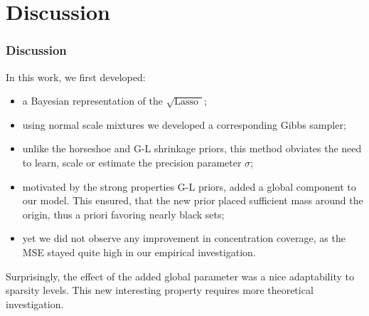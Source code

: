 \documentclass[10pt]{beamer}
\theoremstyle{plain}
\newcommand{\blankline}{\quad\pagebreak[3]}
\def\sql{$\sqrt{\text{Lasso }}$}
\def\sqdl{$\sqrt{\text{DL }}$}
\begin{document}
\section{Discussion}
\begin{frame}
\frametitle{Discussion}
In this work, we first developed:

\begin{itemize}
	\item  a Bayesian representation of the \sql;
	\item using normal scale mixtures we developed a corresponding Gibbs sampler;
	\item unlike the horseshoe and G-L shrinkage priors, this method obviates the need to learn, scale or estimate the precision parameter $\sigma$;
	\item motivated by the strong properties G-L priors, added a global component to our model. This ensured, that the new prior placed sufficient mass around the origin, thus a priori favoring nearly black sets; 
	\item yet we did not observe any improvement in concentration coverage, as the MSE stayed quite high in our empirical investigation.
	\end{itemize}
		
		\blankline
		 Surprisingly, the effect of the added global parameter was a nice adaptability to sparsity levels. This new interesting property requires more theoretical investigation. 

 








\end{frame}
\end{document}
